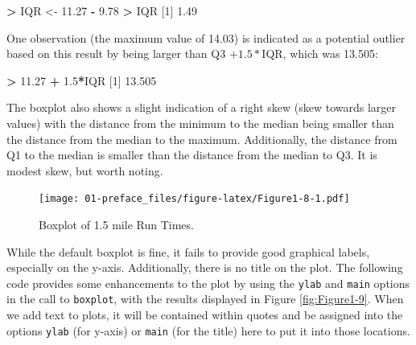 \documentclass[]{book}
\newenvironment{Shaded}{\begin{snugshade}}{\end{snugshade}}
\newcommand{\DecValTok}[1]{\textcolor[rgb]{0.00,0.00,0.81}{#1}}
\newcommand{\FloatTok}[1]{\textcolor[rgb]{0.00,0.00,0.81}{#1}}
\newcommand{\KeywordTok}[1]{\textcolor[rgb]{0.13,0.29,0.53}{\textbf{#1}}}
\newcommand{\NormalTok}[1]{#1}
\newcommand{\OperatorTok}[1]{\textcolor[rgb]{0.81,0.36,0.00}{\textbf{#1}}}
\newcommand{\StringTok}[1]{\textcolor[rgb]{0.31,0.60,0.02}{#1}}
\renewcommand{\indent}{\hspace{15pt}}
\renewenvironment{Shaded}{%
\setlength{\FrameRule}{1.5pt}
\def\FrameCommand{\fboxrule=\FrameRule\fboxsep=5pt 
                  \fcolorbox{framecolor}{shadecolor}}%
\MakeFramed {\FrameRestore}}%
{\endMakeFramed}
\begin{document}
\begin{Shaded}
\begin{Highlighting}[]
\OperatorTok{>}\StringTok{ }\NormalTok{IQR <-}\StringTok{ }\FloatTok{11.27} \OperatorTok{-}\StringTok{ }\FloatTok{9.78}
\OperatorTok{>}\StringTok{ }\NormalTok{IQR}
\NormalTok{[}\DecValTok{1}\NormalTok{] }\FloatTok{1.49}
\end{Highlighting}
\end{Shaded}

One observation (the maximum value of 14.03) is indicated as a potential outlier
based on this result by being larger than Q3 \(+1.5*\)IQR, which was 13.505:

\begin{Shaded}
\begin{Highlighting}[]
\OperatorTok{>}\StringTok{ }\FloatTok{11.27} \OperatorTok{+}\StringTok{ }\FloatTok{1.5}\OperatorTok{*}\NormalTok{IQR}
\NormalTok{[}\DecValTok{1}\NormalTok{] }\FloatTok{13.505}
\end{Highlighting}
\end{Shaded}

\indent The boxplot also shows a slight indication of a right skew (skew towards
larger values) with the distance from the minimum to the median being smaller than the
distance from the median to the maximum. Additionally, the distance from Q1 to
the median is smaller than the distance from the median to Q3. It is modest skew,
but worth noting.



\begin{figure}
\centering
\texttt{[image: 01-preface\_files/figure-latex/Figure1-8-1.pdf]}
\caption{\label{fig:Figure1-8}Boxplot of 1.5 mile Run Times.}
\end{figure}

\begin{Shaded}
\end{Shaded}

\indent While the default boxplot is fine, it fails to provide good graphical labels,
especially on the y-axis. Additionally, there is no title on the plot. The
following code provides some enhancements to the plot by using the \texttt{ylab} and
\texttt{main} options in the call to \texttt{boxplot}, with the results displayed in
Figure \ref{fig:Figure1-9}. When we add text to plots, it will be contained within quotes and
be assigned into the options \texttt{ylab} (for y-axis) or \texttt{main}
(for the title) here to put it into those locations.
\end{document}
